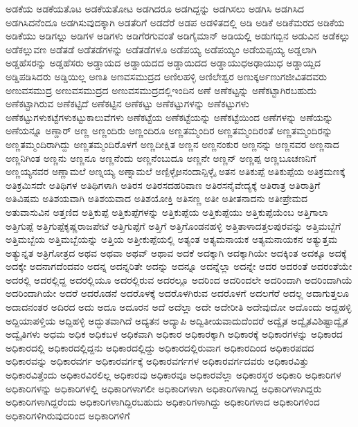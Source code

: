 {ಅಡಕೆಯ
ಅಡಕೆಯತೊಟ
ಅಡಕೆಯತೋಟ
ಅಡಗಿದರೂ
ಅಡಗಿದ್ದನ್ನು
ಅಡಗಿಸಲು
ಅಡಗಿಸಿ
ಅಡಗಿಸಿದ
ಅಡಗಿಸಿದನೆಂದೂ
ಅಡಗಿಸುವುದಕ್ಕಾಗಿ
ಅಡತೆರಿಗೆ
ಅಡದೆರೆ
ಅಡಪ
ಅಡಳಿತದಲ್ಲಿ
ಅಡಿ
ಅಡಿಕೆ
ಅಡಿಕೆಮರದ
ಅಡಿಕೆಯ
ಅಡಿಕೆಯು
ಅಡಿಗಲ್ಲು
ಅಡಿಗಳ
ಅಡಿಗಳು
ಅಡಿಗೆರಗುವಂತೆ
ಅಡಿಗೈಮಾನ್
ಅಡಿಯಲ್ಲಿ
ಅಡುಗಬ್ಬಿನ
ಅಡುವಿನ
ಅಡೆಕಲ್ಲು
ಅಡೆಕಲ್ಲುವಣ
ಅಡೆತಡೆ
ಅಡೆತಡೆಗಳನ್ನು
ಅಡೆತಡೆಗಳೂ
ಅಡೆಪಯ್ಯ
ಅಡೆಪಯ್ಯಂ
ಅಡೆಯಪ್ಪಯ್ಯ
ಅಡ್ಡಲಾಗಿ
ಅಡ್ಡಹೆಸರನ್ನು
ಅಡ್ಡಹೆಸರು
ಅಡ್ಡಾಯದ
ಅಡ್ಡಾಯದದ
ಅಡ್ಡಾಯಿದದ
ಅಡ್ಡಾಯುಧಅಢಾಯುಧ
ಅಡ್ಡಾಯ್ದದ
ಅಡ್ಡಿಪಡಿಸಿದರು
ಅಡ್ಡಿಯಿಲ್ಲ
ಅಣತಿ
ಅಣವಸಮುದ್ರದ
ಅಣಿಲಹಳ್ಳಿ
ಅಣಿಲೇಶ್ವರ
ಅಣುಕ್ಕರ್ಅಣುಗಜೀವಿತದವರು
ಅಣುವಸಮುದ್ರ
ಅಣುವಸಮುದ್ರದ
ಅಣುವಸಮುದ್ರದಲ್ಲಿಇಂದಿನ
ಅಣೆ
ಅಣೆಕಟ್ಟನ್ನು
ಅಣೆಕಟ್ಟಾಗಿರಬಹುದು
ಅಣೆಕಟ್ಟಾಗಿರುವ
ಅಣೆಕಟ್ಟಿದೆ
ಅಣೆಕಟ್ಟಿನ
ಅಣೆಕಟ್ಟು
ಅಣೆಕಟ್ಟುಗಳನ್ನು
ಅಣೆಕಟ್ಟುಗಳು
ಅಣೆಕಟ್ಟುಗಳುಕಟ್ಟೆಗಳುಕಟ್ಟುಕಾಲುವೆಗಳು
ಅಣೆಕಟ್ಟೆಯ
ಅಣೆಕಟ್ಟೆಯನ್ನು
ಅಣೆಕಟ್ಟೆಯಿಂದ
ಅಣೆಗಳನ್ನು
ಅಣೆಯನ್ನು
ಅಣೆಯನ್ನೂ
ಅಣ್ಡಾರ್
ಅಣ್ಣ
ಅಣ್ಣಂದಿರು
ಅಣ್ಣಂದಿರೂ
ಅಣ್ಣತಮ್ಮಂದಿರ
ಅಣ್ಣತಮ್ಮಂದಿರಂತೆ
ಅಣ್ಣತಮ್ಮಂದಿರನ್ನು
ಅಣ್ಣತಮ್ಮಂದಿರಾಗಿದ್ದು
ಅಣ್ಣತಮ್ಮಂದಿರೊಳಗೆ
ಅಣ್ಣದೀಕ್ಷಿತ
ಅಣ್ಣನ
ಅಣ್ಣನಂಕುರ
ಅಣ್ಣನನ್ನು
ಅಣ್ಣನವರ
ಅಣ್ಣನಾದ
ಅಣ್ಣನಿಗಿಂತ
ಅಣ್ಣನು
ಅಣ್ಣನೂ
ಅಣ್ಣನೆಂದು
ಅಣ್ಣನೆಂಬುದೂ
ಅಣ್ಣನೇ
ಅಣ್ಣನ್
ಅಣ್ಣಪ್ಪ
ಅಣ್ಣಬೂಚಣನಿಗೆ
ಅಣ್ಣಯ್ಯನವರ
ಅಣ್ಣಾಮಲೆ
ಅಣ್ನಯ್ಯ
ಅಣ್ನಾಮಲೆ
ಅಣ್ಪಿಳ್ಳೈಅನಂದಾನ್ಪಿಳ್ಳೈ
ಅತನ
ಅತಿಕುಪ್ಪೆ
ಅತಿಕುಪ್ಪೆಯ
ಅತಿಕ್ರಮಣಕ್ಕೆ
ಅತಿಕ್ರಮಿಸದೇ
ಅತಿಥಿಗಳ
ಅತಿಥಿಗಳಾಗಿ
ಅತಿರಸ
ಅತಿರಸದಹರಿವಾಣ
ಅತಿರಸನೈವೇದ್ಯಕ್ಕೆ
ಅತಿರಾತ್ರ
ಅತಿರಾತ್ರಿಗೆ
ಅತಿವಿಷಮ
ಅತಿಶಯವಾಗಿ
ಅತಿಶಯವಾದ
ಅತಿಶಯೋಕ್ತಿ
ಅತಿಸಣ್ಣ
ಅತೀ
ಅತೀತನಾದನು
ಅತೀಪ್ರೇಮದ
ಅತುವಾಸುವಿನ
ಅತ್ತಣಿದ
ಅತ್ತಿಕುಪ್ಪೆ
ಅತ್ತಿಕುಪ್ಪೆಗಳನ್ನು
ಅತ್ತಿಕುಪ್ಪೆಯ
ಅತ್ತಿಕುಪ್ಪೆಯು
ಅತ್ತಿಕುಪ್ಪೆಯೆಂಬ
ಅತ್ತಿಗಾಲಾ
ಅತ್ತಿಗುಪ್ಪೆ
ಅತ್ತಿಗುಪ್ಪೆಕೃಷ್ಣರಾಜಪೇಟೆ
ಅತ್ತಿಗುಪ್ಪೆಗೆ
ಅತ್ತಿಗೆ
ಅತ್ತಿಗೊಂಡನಹಳ್ಳಿ
ಅತ್ತಿತಾಳಾದತ್ತಲಪುರವನ್ನು
ಅತ್ತಿಮಬ್ಬೆಗೆ
ಅತ್ತಿಮಬ್ಬೆಯ
ಅತ್ತಿಮಬ್ಬೆಯನ್ನು
ಅತ್ತಿಯ
ಅತ್ತೀಕುಪ್ಪೆಯಲ್ಲಿ
ಅತ್ಯಂತ
ಅತ್ಯಮನಾಯಕ
ಅತ್ಯಮನಾಯಕನ
ಅತ್ಯುತ್ತಮ
ಅತ್ಯುನ್ನತ
ಅತ್ರಿಗೋತ್ರದ
ಅಥವ
ಅಥವಾ
ಅಥವ್
ಅಥಾವ
ಅದಕೆ
ಅದಕ್ಕಾಗಿ
ಅದಕ್ಕಾಗಿಯೇ
ಅದಕ್ಕಿಂತ
ಅದಕ್ಕೂ
ಅದಕ್ಕೆ
ಅದಕ್ಕೇ
ಅದನಾಗದೆಂದವಂ
ಅದನ್ನ
ಅದನ್ನರಿತೇ
ಅದನ್ನು
ಅದನ್ನೂ
ಅದನ್ನೆಲ್ಲಾ
ಅದನ್ನೇ
ಅದರ
ಅದರಂತೆ
ಅದರಂತೆಯೇ
ಅದರಲ್ಲಿ
ಅದರಲ್ಲಿದ್ದ
ಅದರಲ್ಲಿಯೂ
ಅದರಲ್ಲಿರುವ
ಅದರಲ್ಲೂ
ಅದರಿಂದ
ಅದರಿಂದಲೇ
ಅದರಿಂದಾಗಿ
ಅದರಿಂದಾಗಿಯೆ
ಅದರಿಂದಾಗಿಯೇ
ಅದರೆ
ಅದರೊಡನೆ
ಅದರೊಳಕ್ಕೆ
ಅದರೊಳಗಿರುವ
ಅದರೊಳಗೆ
ಅದಲಗೆರೆ
ಅದಲ್ಲ
ಅದಾಗುತ್ತಲೂ
ಅದಾದನಂತರ
ಅದಿರದ
ಅದು
ಅದೂ
ಅದೂರನ
ಅದೆ
ಅದೆಲ್ಲಾ
ಅದೇ
ಅದೇರೀತಿ
ಅದೇವುದೋ
ಅದೊಂದು
ಅದ್ದಹಳ್ಳಿ
ಅದ್ದಿಯಾಪಳ್ತಿಯ
ಅದ್ದಿಹಳ್ಳಿ
ಅದ್ಭುತವಾಗಿದೆ
ಅದ್ಯತನ
ಅದ್ಯಾಪಿ
ಅದ್ವಿತೀಯವಾದುದೆಂದರೆ
ಅದ್ವೈತ
ಅದ್ವೈತವಿಶಿಷ್ಟಾದ್ವೈತ
ಅದ್ವೈತಿಗಳು
ಅಧಮ
ಅಧಿಕ
ಅಧಿಕಬಳ
ಅಧಿಕವಾಗಿ
ಅಧಿಕಾರ
ಅಧಿಕಾರಕ್ಕಾಗಿ
ಅಧಿಕಾರಕ್ಕೆ
ಅಧಿಕಾರಗಳನ್ನು
ಅಧಿಕಾರದ
ಅಧಿಕಾರದಲ್ಲಿ
ಅಧಿಕಾರದಲ್ಲಿದ್ದನು
ಅಧಿಕಾರದಲ್ಲಿದ್ದು
ಅಧಿಕಾರದಲ್ಲಿರುವಾಗ
ಅಧಿಕಾರದಿಂದ
ಅಧಿಕಾರಪದದ
ಅಧಿಕಾರವನ್ನು
ಅಧಿಕಾರವರ್ಗ
ಅಧಿಕಾರವರ್ಗಕ್ಕೆ
ಅಧಿಕಾರವರ್ಗಗಳ
ಅಧಿಕಾರವರ್ಗದವರು
ಅಧಿಕಾರವಿತ್ತು
ಅಧಿಕಾರವಿತ್ತೆಂದು
ಅಧಿಕಾರವಿರಲಿಲ್ಲ
ಅಧಿಕಾರವು
ಅಧಿಕಾರವೂ
ಅಧಿಕಾರವೆಲ್ಲಾ
ಅಧಿಕಾರಸ್ಥರ
ಅಧಿಕಾರಿ
ಅಧಿಕಾರಿಗಳ
ಅಧಿಕಾರಿಗಳನ್ನು
ಅಧಿಕಾರಿಗಳಲ್ಲಿ
ಅಧಿಕಾರಿಗಳಾಗಲೀ
ಅಧಿಕಾರಿಗಳಾಗಿ
ಅಧಿಕಾರಿಗಳಾಗಿದ್ದ
ಅಧಿಕಾರಿಗಳಾಗಿದ್ದರು
ಅಧಿಕಾರಿಗಳಾಗಿದ್ದರೆಂದು
ಅಧಿಕಾರಿಗಳಾಗಿದ್ದಿರಬಹುದು
ಅಧಿಕಾರಿಗಳಾಗಿದ್ದು
ಅಧಿಕಾರಿಗಳಾದ
ಅಧಿಕಾರಿಗಳಿಂದ
ಅಧಿಕಾರಿಗಳಿಗಿರುವುದರಿಂದ
ಅಧಿಕಾರಿಗಳಿಗೆ
}

